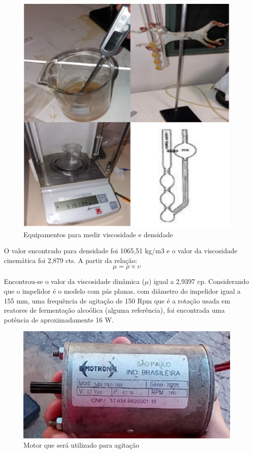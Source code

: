 \begin{figure}[h]
	\centering
  \includegraphics[keepaspectratio=true,scale=0.5]{figuras/equipamentos.eps}
  \caption{Equipamentos para medir viscosidade e densidade}
  \label{equipamentos}
\end{figure}

O valor encontrado para densidade foi 1065,51 kg/m3 e o valor da viscosidade cinemática foi 2,879 cts. A partir da relação:
\[\mu = \rho \times \upsilon\]

Encontrou-se o valor da viscosidade dinâmica (\(\mu\)) igual a 2,9397 cp.
Considerando que o impelidor é o modelo com pás planas, com diâmetro do impelidor igual a 155 mm, uma frequência de agitação de 150 Rpm que é a rotação usada em reatores de fermentação alcoólica (alguma referência), foi encontrada uma potência de aproximadamente 16 W.

\begin{figure}[H]
	\centering
  \includegraphics[keepaspectratio=true,scale=0.5]{figuras/motor.eps}
  \caption{Motor que será utilizado para agitação}
  \label{motor}
\end{figure}


